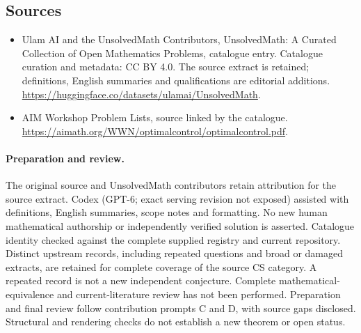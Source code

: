 \documentclass[11pt]{article}
\begin{document}
\subsection{Sources}
\begin{itemize}
\item[\hypertarget{source:statement:1}{S1}] Ulam AI and the UnsolvedMath Contributors, UnsolvedMath: A Curated Collection of Open Mathematics Problems, catalogue entry. Catalogue curation and metadata: CC BY 4.0. The source extract is retained; definitions, English summaries and qualifications are editorial additions.
\url{https://huggingface.co/datasets/ulamai/UnsolvedMath}.
\item[\hypertarget{source:statement:2}{S2}] AIM Workshop Problem Lists, source linked by the catalogue.
\url{https://aimath.org/WWN/optimalcontrol/optimalcontrol.pdf}.
\end{itemize}
\paragraph{Preparation and review.}
The original source and UnsolvedMath contributors retain attribution for the source extract. Codex (GPT-6; exact serving revision not exposed) assisted with definitions, English summaries, scope notes and formatting. No new human mathematical authorship or independently verified solution is asserted. Catalogue identity checked against the complete supplied registry and current repository. Distinct upstream records, including repeated questions and broad or damaged extracts, are retained for complete coverage of the source CS category. A repeated record is not a new independent conjecture. Complete mathematical-equivalence and current-literature review has not been performed. Preparation and final review follow contribution prompts C and D, with source gaps disclosed. Structural and rendering checks do not establish a new theorem or open status.
\label{end:statement}
\end{document}
